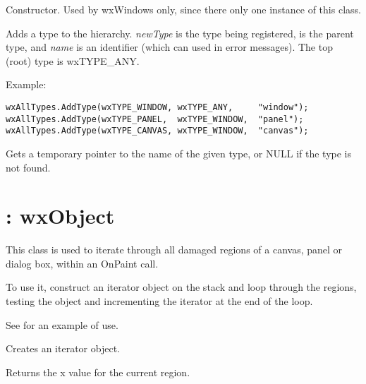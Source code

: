 

Constructor. Used by wxWindows only, since there only one instance of this
class.



Adds a type to the hierarchy. {\it newType} is the type being registered,
 is the parent type, and {\it name} is an identifier
(which can used in error messages). The top (root) type is wxTYPE\_ANY.

Example:

\begin{verbatim}
wxAllTypes.AddType(wxTYPE_WINDOW, wxTYPE_ANY,     "window");
wxAllTypes.AddType(wxTYPE_PANEL,  wxTYPE_WINDOW,  "panel");
wxAllTypes.AddType(wxTYPE_CANVAS, wxTYPE_WINDOW,  "canvas");
\end{verbatim}



Gets a temporary pointer to the name of the given type, or NULL if the type
is not found.


\section{: wxObject}\label{wxupdateiterator}

This class is used to iterate through all damaged regions of a canvas, panel
or dialog box, within an OnPaint call.

To use it, construct an iterator object on the stack and loop through the
regions, testing the object and incrementing the iterator at the end of the loop.

See  for an example of use.



Creates an iterator object.



Returns the x value for the current region.


